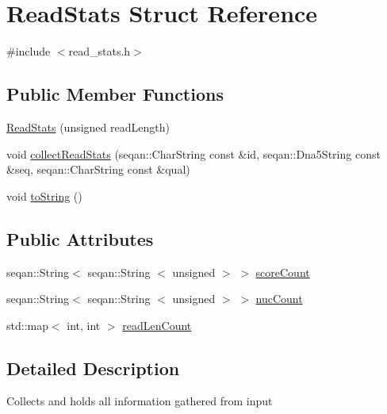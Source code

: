 \hypertarget{structReadStats}{\section{\-Read\-Stats \-Struct \-Reference}
\label{structReadStats}
}


{\ttfamily \#include $<$read\-\_\-stats.\-h$>$}

\subsection*{\-Public \-Member \-Functions}
\begin{DoxyCompactItemize}
\item 
\hyperlink{structReadStats_a42157da1cf5611d9d6dc7446f1aeffaf}{\-Read\-Stats} (unsigned read\-Length)
\item 
void \hyperlink{structReadStats_aa61f5f9bb9e9302e0b22e6909c52762c}{collect\-Read\-Stats} (seqan\-::\-Char\-String const \&id, seqan\-::\-Dna5\-String const \&seq, seqan\-::\-Char\-String const \&qual)
\item 
void \hyperlink{structReadStats_a4c8ded2f5f88cce65350f752774e463b}{to\-String} ()
\end{DoxyCompactItemize}
\subsection*{\-Public \-Attributes}
\begin{DoxyCompactItemize}
\item 
seqan\-::\-String$<$ seqan\-::\-String\*
$<$ unsigned $>$ $>$ \hyperlink{structReadStats_a301a09b8d357a68ece8140731f0c7a62}{score\-Count}
\item 
seqan\-::\-String$<$ seqan\-::\-String\*
$<$ unsigned $>$ $>$ \hyperlink{structReadStats_aa8ce6cf2b6feee564b6d30190f5e9229}{nuc\-Count}
\item 
std\-::map$<$ int, int $>$ \hyperlink{structReadStats_a2f389e19dcd24901f024df8e3cb41b25}{read\-Len\-Count}
\end{DoxyCompactItemize}


\subsection{\-Detailed \-Description}
\-Collects and holds all information gathered from input 

